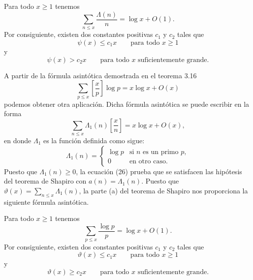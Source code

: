 \documentclass[12pt,a4paper]{book}
\begin{document}
    \begin{teorema}
        Para todo $x\geq1$ tenemos
        \begin{equation}
            \sum_{n\leq x}\frac{\Lambda(n)}{n}=\log x+O(1).
        \end{equation}
        Por consiguiente, existen dos constantes positivas $c_{1}$ y $c_{2}$ tales que
        \begin{equation*}
            \psi(x)\leq c_{1}x\qquad\text{para todo } x\geq1
        \end{equation*}
        y
        \begin{equation*}
            \psi(x)>c_{2}x\qquad\text{para todo } x \text{ suficientemente grande.}
        \end{equation*}
    \end{teorema}

    A partir de la fórmula asintótica demostrada en el teorema 3.16
    \begin{equation*}
        \sum_{p\leq x}\left[\frac{x}{p}\right]\log p=x\log x+O(x)
    \end{equation*}
    podemos obtener otra aplicación. Dicha fórmula asintótica se puede escribir en la
    forma
    \begin{equation}
        \sum_{n\leq x}\Lambda_{1}(n)\left[\frac{x}{n}\right]=x\log x+O(x),
    \end{equation}
    en donde $\Lambda_{1}$ es la función definida como sigue:
    \begin{equation*}
        \Lambda_{1}(n)=
        \begin{cases}
            \log p & \text{si } n \text{ es un primo } p,\\
            0 & \text{en otro caso.}
        \end{cases}
    \end{equation*}
    Puesto que $\Lambda_{1}(n)\geq0$, la ecuación (26) prueba que se satisfacen las
    hipótesis del teorema de Shapiro con $a(n)=\Lambda_{1}(n)$. Puesto que
    $\vartheta(x)=\sum_{n\leq x}\Lambda_{1}(n)$, la parte (a) del teorema de Shapiro nos
    proporciona la siguiente fórmula asintótica.

    \begin{teorema}
        Para todo $x\geq1$ tenemos
        \begin{equation}
            \sum_{p\leq x}\frac{\log p}{p}=\log x+O(1).
        \end{equation}
        Por consiguiente, existen dos constantes positivas $c_{1}$ y $c_{2}$ tales que
        \begin{equation*}
            \vartheta(x)\leq c_{1}x\qquad\text{para todo } x\geq1
        \end{equation*}
        y
        \begin{equation*}
            \vartheta(x)\geq c_{2}x\qquad\text{para todo } x \text{ suficientemente grande.}
        \end{equation*}
    \end{teorema}
\end{document}
